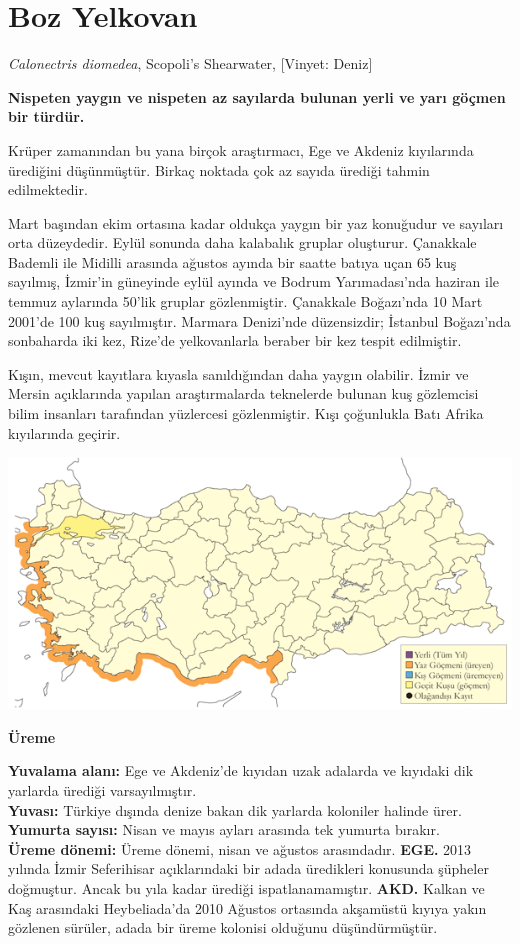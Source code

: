 \documentclass[
  letterpaper,
  DIV=11,
  numbers=noendperiod]{scrreprt}
\begin{document}
\section{Boz Yelkovan}\label{boz-yelkovan}

\emph{Calonectris diomedea}, Scopoli's Shearwater, {[}Vinyet: Deniz{]}

\textbf{Nispeten yaygın ve nispeten az sayılarda bulunan yerli ve yarı
göçmen bir türdür.}

Krüper zamanından bu yana birçok araştırmacı, Ege ve Akdeniz kıyılarında
ürediğini düşünmüştür. Birkaç noktada çok az sayıda ürediği tahmin
edilmektedir.

Mart başından ekim ortasına kadar oldukça yaygın bir yaz konuğudur ve
sayıları orta düzeydedir. Eylül sonunda daha kalabalık gruplar
oluşturur. Çanakkale Bademli ile Midilli arasında ağustos ayında bir
saatte batıya uçan 65 kuş sayılmış, İzmir'in güneyinde eylül ayında ve
Bodrum Yarımadası'nda haziran ile temmuz aylarında 50'lik gruplar
gözlenmiştir. Çanakkale Boğazı'nda 10 Mart 2001'de 100 kuş sayılmıştır.
Marmara Denizi'nde düzensizdir; İstanbul Boğazı'nda sonbaharda iki kez,
Rize'de yelkovanlarla beraber bir kez tespit edilmiştir.

Kışın, mevcut kayıtlara kıyasla sanıldığından daha yaygın olabilir.
İzmir ve Mersin açıklarında yapılan araştırmalarda teknelerde bulunan
kuş gözlemcisi bilim insanları tarafından yüzlercesi gözlenmiştir. Kışı
çoğunlukla Batı Afrika kıyılarında geçirir.

\includegraphics{images/harita_Page_048.png}

\textbf{Üreme}

\textbf{Yuvalama alanı:} Ege ve Akdeniz'de kıyıdan uzak adalarda ve
kıyıdaki dik yarlarda ürediği varsayılmıştır.\\
\textbf{Yuvası:} Türkiye dışında denize bakan dik yarlarda koloniler
halinde ürer.\\
\textbf{Yumurta sayısı:} Nisan ve mayıs ayları arasında tek yumurta
bırakır.\\
\textbf{Üreme dönemi:} Üreme dönemi, nisan ve ağustos arasındadır.
\textbf{EGE.} 2013 yılında İzmir Seferihisar açıklarındaki bir adada
üredikleri konusunda şüpheler doğmuştur. Ancak bu yıla kadar ürediği
ispatlanamamıştır. \textbf{AKD.} Kalkan ve Kaş arasındaki Heybeliada'da
2010 Ağustos ortasında akşamüstü kıyıya yakın gözlenen sürüler, adada
bir üreme kolonisi olduğunu düşündürmüştür.
\end{document}
